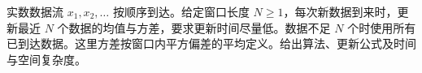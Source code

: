 实数数据流 $x_1,x_2,\ldots$ 按顺序到达。给定窗口长度 $N\ge1$，每次新数据到来时，更新最近 $N$ 个数据的均值与方差，要求更新时间尽量低。数据不足 $N$ 个时使用所有已到达数据。这里方差按窗口内平方偏差的平均定义。给出算法、更新公式及时间与空间复杂度。
